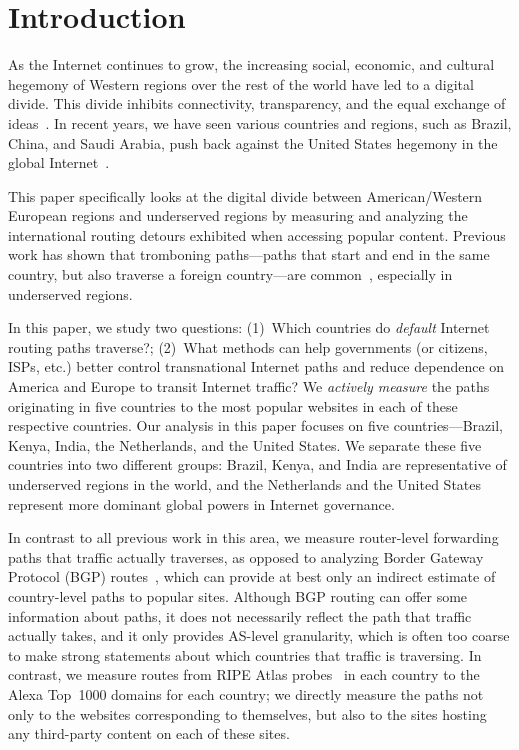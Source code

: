 \section{Introduction}
\label{sec:intro}

As the Internet continues to grow, the increasing social, economic, and cultural 
hegemony of Western regions over the rest of the world have led to a digital divide.  This 
divide inhibits connectivity, transparency, and the equal exchange of ideas~\cite{hegemony}. In 
recent years, we have seen various countries and regions, such as Brazil, China, and Saudi Arabia, push back against the United States hegemony in the global Internet~\cite{hegemony2, hegemony_china,
hegemony_EU}.  

This paper specifically looks at the digital divide between American/Western European regions and 
underserved regions by measuring and analyzing the international routing detours exhibited when 
accessing popular content. Previous work has shown that tromboning
paths---paths that start and end in the same country, but also traverse a
foreign country---are common~\cite{shah2015characterizing,gupta2014peering}, especially in 
underserved regions.  

In this paper, we study two questions: (1)~Which countries do {\em   default}
Internet routing paths traverse?; (2)~What methods can  help governments (or citizens, 
ISPs, etc.) better control transnational Internet paths and reduce dependence on America and 
Europe to transit Internet traffic?  We {\em actively
measure} the paths originating in five countries to the most popular
websites in each of these respective countries.
Our analysis in this paper focuses on five countries---Brazil,
Kenya, India, the Netherlands, and the United States. We separate these five 
countries into two different groups: Brazil, Kenya, and India are representative of 
underserved regions in the world, and the Netherlands and the United States represent 
more dominant global powers in Internet governance.   

In contrast to all previous work in this area, we measure router-level
forwarding paths that traffic actually traverses, as opposed to analyzing Border
Gateway Protocol (BGP)
routes~\cite{karlin2009nation,shah2015characterizing}, which can provide at
best only an indirect estimate of country-level paths to popular sites.
Although BGP routing can offer some information about paths, it does not
necessarily reflect the path that traffic actually takes, and it only provides
AS-level granularity, which is often too coarse to make strong statements
about which countries that traffic is traversing.  In contrast, we measure
routes from RIPE Atlas probes~\cite{ripe_atlas} in each country to the Alexa
Top~1000 domains for each country; we directly measure the paths not only to
the websites corresponding to themselves, but also to the sites hosting any
third-party content on each of these sites.

